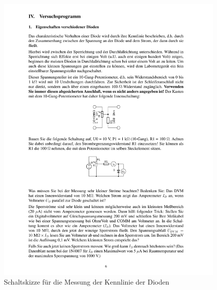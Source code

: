 \documentclass[12pt,a4paper]{article}
\begin{document}
\begin{figure}[H] 
  \centering
    \includegraphics[trim = 10mm 100mm 10mm 155mm, clip, scale = 1]{ep2_14[Page6].pdf}
  	\caption[Schaltskizze für die Messung der Kennlinie der Dioden]{Schaltskizze für die Messung der Kennlinie der Dioden\footnotemark}
  \label{fig:1}
\end{figure}
\end{document}
